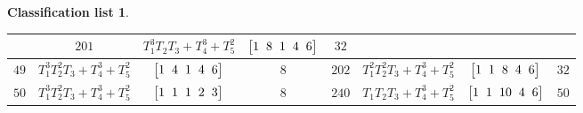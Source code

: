 \documentclass[pdftex]{sigma}%
\theoremstyle{definition}
\newtheorem{class-list}[thm]{Classification list}
\numberwithin{equation}{section}
\begin{document}
\begin{class-list}
\begin{table}[h!]
\begin{tabu}{c|c|c|c||c|c|c|c}
&${201}$&${T_{1}^{3}T_{2}T_{3}+T_{4}^{3}+T_{5}^{2}}$
&$\arraycolsep=1mm\begin{bmatrix}{1} & {8} & {1} & {4} & {6}\end{bmatrix}$&${32}$
\\
\hline
${49}$&${T_{1}^{3}T_{2}^{2}T_{3}+T_{4}^{3}+T_{5}^{2}}$
&$\arraycolsep=1mm\begin{bmatrix}{1} & {4} & {1} & {4} & {6}\end{bmatrix}$&${8}$
&${202}$&${T_{1}^{2}T_{2}^{2}T_{3}+T_{4}^{3}+T_{5}^{2}}$
&$\arraycolsep=1mm\begin{bmatrix}{1} & {1} & {8} & {4} & {6}\end{bmatrix}$&${32}$
\\
\hline
${50}$&${T_{1}^{3}T_{2}^{2}T_{3}+T_{4}^{3}+T_{5}^{2}}$
&$\arraycolsep=1mm\begin{bmatrix}{1} & {1} & {1} & {2} & {3}\end{bmatrix}$&${8}$
&${240}$&${T_{1}T_{2}T_{3}+T_{4}^{3}+T_{5}^{2}}$
&$\arraycolsep=1mm\begin{bmatrix}{1} & {1} & {10} & {4} & {6}\end{bmatrix}$&${50}$
\\
\hline
\end{tabu}\vspace{-4mm}
\end{table}
\end{class-list}
\end{document}
